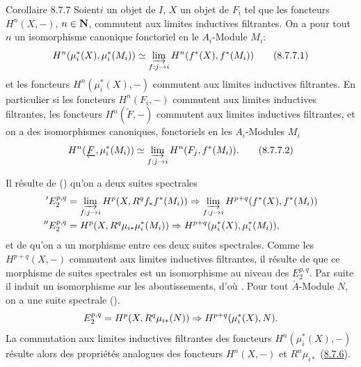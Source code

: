 \documentclass[10pt]{../fichiers-configuration-latex/smfart}
\begin{document}
\begin{enonce*}{Corollaire 8.7.7}
Soient\pageoriginale $i$ un objet de $I$, $X$ un objet de $F_i$ tel que les
foncteurs $H^{n} (X, -)$, $n \in \mathbf{N}$, commutent aux limites
inductives filtrantes. On a pour tout $n$ un isomorphisme canonique
fonctoriel en le $A_i$-Module $M_i$:
\begin{equation*}
H^n (\mu_{i}^{\ast}(X), \mu^{\ast}_i (M_i)) \simeq \varinjlim_{f:j\to i}
H^n (f^{\ast} (X), f^{\ast} (M_i))\tag{8.7.7.1}
\end{equation*}
et les foncteurs $H^{n} (\mu^{\ast}_i (X), -)$ commutent aux limites
inductives filtrantes. En particulier si les foncteurs $H^{n} (F_i,
-)$ commutent aux limites inductives filtrantes, les foncteurs $H^n
(\underleftarrow{F}, -)$ commutent aux limites inductives filtrantes, et
on a des isomorphismes canoniques, fonctoriels en les $A_i$-Modules
$M_i$
\begin{equation*}
H^n (\underleftarrow{F}, \mu_{i}^{\ast} (M_i)) \simeq \varinjlim_{f:j\to i}
H^n (F_j, f^{\ast} (M_i)){\quoi}.\tag{8.7.7.2}
\end{equation*}
\end{enonce*}

\noindent
Il résulte de () qu'on a deux suites spectrales
\begin{align*}
'E_{2}^{p, q} &= \varinjlim_{f:j\to i} H^p(X, R^q f_{\ast}
f^{\ast} (M_i)) \Rightarrow \varinjlim_{f:j\to i}
H^{p+q}(f^{\ast} (X), f^{\ast} (M_i))\\
''E_{2}^{p, q} &=  H^p(X, R^q \mu_{i\ast} \mu^{\ast}_i (M_i))
\Rightarrow H^{p+q} (\mu^{\ast}_i (X), \mu^{\ast}_i (M_i)){\quoi},
\end{align*}
et de  qu'on a un morphisme entre ces deux suites
spectrales. Comme les $H^{p+q} (X, -)$ commutent aux limites
inductives filtrantes, il résulte de  que ce morphisme de
suites spectrales est un isomorphisme au niveau des $E^{p, q}_2$. Par
suite il induit un isomorphisme sur les aboutissements, d'où
. Pour tout $\underrightarrow{A}$-Module $N$, on a une suite
spectrale ().
$$
E^{p, q}_2 = H^{p} (X, R^q \mu_{i\ast} (N)) \Rightarrow H^{p+q}
(\mu^{\ast}_i (X), N){}.
$$
La commutation aux limites inductives filtrantes des foncteurs $H^{n}
(\mu^{\ast}_i (X), -)$ résulte alors des propriétés analogues des
foncteurs $H^{n} (X, -)$ et $R^n \mu_{i\ast}$ (\hyperref[VI.cor8.7.6]{8.7.6}).
\end{document}
